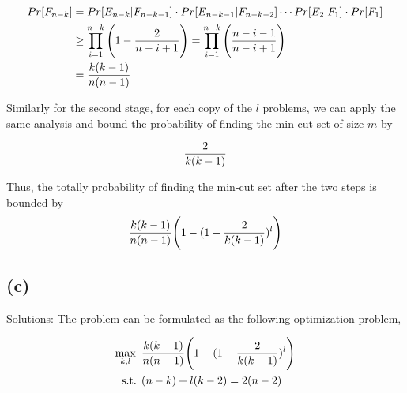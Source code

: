 \documentclass[10pt]{537homework}
\begin{document}
\begin{align*}
  Pr[F_{n-k}]   & = Pr[E_{n-k}|F_{n-k-1}] \cdot Pr[E_{n-k-1}|F_{n-k-2}] \cdots Pr[E_2|F_1]\cdot Pr[F_1] \\
                & \geq \prod_{i=1}^{n-k} \Bigg( 1 - {2 \over n-i+1} \Bigg) = \prod_{i=1}^{n-k} \Bigg( {n-i-1 \over n-i+1} \Bigg) \\
                & = {k(k-1) \over n(n-1)}
\end{align*}

Similarly for the second stage, for each copy of the $l$ problems, we can apply the same analysis and bound the probability of finding the min-cut set of size $m$ by 

$$
{2 \over k(k-1)}
$$

Thus, the totally probability of finding the min-cut set after the two steps is bounded by 
$$
{k(k-1) \over n(n-1)} \Bigg(1 - (1-{2 \over k(k-1)})^l\Bigg)
$$


\subsection*{(c)} Solutions: The problem can be formulated as the following optimization problem,

\begin{align*}
  \max_{k, l} \text{   }& {k(k-1) \over n(n-1)} \Bigg(1 - (1-{2 \over k(k-1)})^l\Bigg) \\
  \text{s.t.   } & (n-k) + l(k-2) = 2(n-2)
\end{align*}
\end{document}
